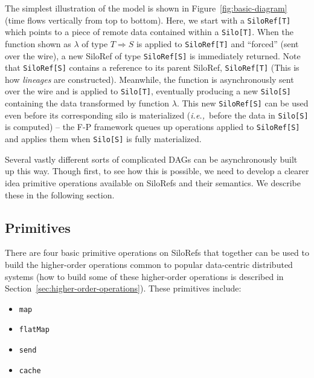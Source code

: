 \documentclass[preprint]{sigplanconf}
\theoremstyle{definition}
\theoremstyle{definition}
\newcommand{\ie}{{\em i.e.,~}}
\begin{document}
The simplest illustration of the model is shown in Figure~\ref{fig:basic-diagram}
(time flows vertically from top to bottom). Here, we start with a
\verb|SiloRef[T]| which points to a piece of remote data contained within a
\verb|Silo[T]|. When the function shown as $\lambda$ of type $T \Rightarrow S$
is applied to \verb|SiloRef[T]| and ``forced'' (sent over the wire), a new
SiloRef of type \verb|SiloRef[S]| is immediately returned. Note that
\verb|SiloRef[S]| contains a reference to its parent SiloRef,
\verb|SiloRef[T]| (This is how {\em lineages} are constructed). Meanwhile, the
function is asynchronously sent over the wire and is applied to
\verb|Silo[T]|, eventually producing a new \verb|Silo[S]| containing the data
transformed by function $\lambda$. This new \verb|SiloRef[S]| can be
used even before its corresponding silo is materialized (\ie before the data
in \verb|Silo[S]| is computed) – the F-P framework queues up operations
applied to \verb|SiloRef[S]| and applies them when \verb|Silo[S]| is fully
materialized.

Several vastly different sorts of complicated DAGs can be asynchronously built
up this way. Though first, to see how this is possible, we need to develop a
clearer idea primitive operations available on SiloRefs and their semantics.
We describe these in the following section.


\subsection{Primitives}
\label{sec:primitives}

There are four basic primitive operations on SiloRefs that together can be
used to build the higher-order operations common to popular data-centric
distributed systems (how to build some of these higher-order operations is
described in Section~\ref{sec:higher-order-operations}). These primitives
include:

\begin{itemize}[noitemsep,nolistsep]
\item \verb|map|
\item \verb|flatMap|
\item \verb|send|
\item \verb|cache|
\end{itemize}
\end{document}
